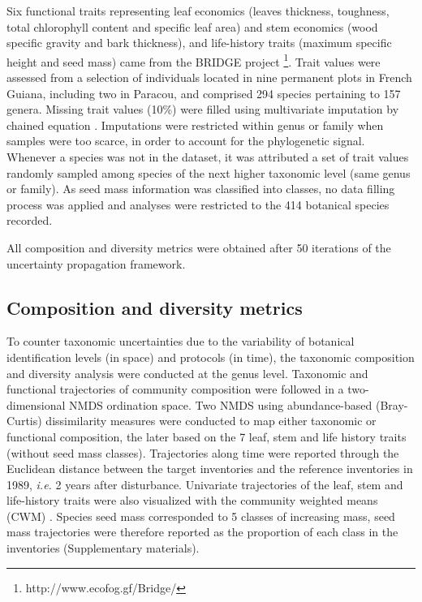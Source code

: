 \documentclass[fleqn,10pt]{ArtEcoFoG} %
\begin{document}
Six functional traits representing leaf economics (leaves thickness,
toughness, total chlorophyll content and specific leaf area) and stem
economics (wood specific gravity and bark thickness), and life-history
traits (maximum specific height and seed mass) came from the BRIDGE
project \footnote{http://www.ecofog.gf/Bridge/}. Trait values were
assessed from a selection of individuals located in nine permanent plots
in French Guiana, including two in Paracou, and comprised 294 species
pertaining to 157 genera. Missing trait values (10\%) were filled using
multivariate imputation by chained equation \citep{Mice2011}.
Imputations were restricted within genus or family when samples were too
scarce, in order to account for the phylogenetic signal. Whenever a
species was not in the dataset, it was attributed a set of trait values
randomly sampled among species of the next higher taxonomic level (same
genus or family). As seed mass information was classified into classes,
no data filling process was applied and analyses were restricted to the
414 botanical species recorded.

All composition and diversity metrics were obtained after 50 iterations
of the uncertainty propagation framework.

\subsection{Composition and diversity
metrics}\label{composition-and-diversity-metrics}

To counter taxonomic uncertainties due to the variability of botanical
identification levels (in space) and protocols (in time), the taxonomic
composition and diversity analysis were conducted at the genus level.
Taxonomic and functional trajectories of community composition were
followed in a two-dimensional NMDS ordination space. Two NMDS using
abundance-based (Bray-Curtis) dissimilarity measures were conducted to
map either taxonomic or functional composition, the later based on the 7
leaf, stem and life history traits (without seed mass classes).
Trajectories along time were reported through the Euclidean distance
between the target inventories and the reference inventories in 1989,
\emph{i.e.} 2 years after disturbance. Univariate trajectories of the
leaf, stem and life-history traits were also visualized with the
community weighted means (CWM) \citep{Diaz2007}. Species seed mass
corresponded to 5 classes of increasing mass, seed mass trajectories
were therefore reported as the proportion of each class in the
inventories (Supplementary materials).
\end{document}
